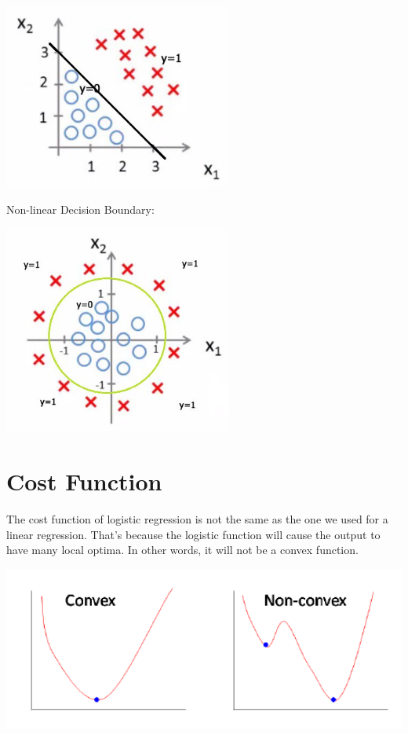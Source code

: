 \documentclass{42-en}
\begin{document}
\centerline{\includegraphics[width=75mm]{images/linear_db.jpeg}}

Non-linear Decision Boundary:\\

\centerline{\includegraphics[width=75mm]{images/nonlinear_db.jpeg}}

\section*{Cost Function}

The cost function of logistic regression is not the same as the one we used for a linear regression. That’s because the logistic function will cause the output to have many local optima. In other words, it will not be a convex function.\\

\centerline{\includegraphics[width=150mm]{images/convnconv.png}}
\end{document}
